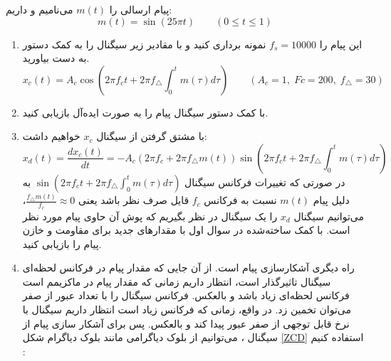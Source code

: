 \documentclass[a4paper]{article}
\begin{document}
پیام ارسالی را $ m(t) $ می‌نامیم و داریم:
\begin{equation*}
	m(t) = \sin(25 \pi t) \qquad (0 \leq t \leq 1)
\end{equation*}
\begin{enumerate}
	\item 
این پیام را 
$ f_{s} = 10000 $
نمونه‌ برداری کنید و با مقادیر زیر سیگنال  را به کمک دستور
  به دست بیاورید.
 \begin{equation*}
	x_{c}(t) = A_{c} \cos(2 \pi f_c t + 2 \pi f_{\triangle} \int_{0}^{t} m(\tau) d\tau) \qquad (A_{c}=1, \; Fc = 200, \; f_{\triangle}=30)
\end{equation*}
	\item 
	با کمک دستور
	  سیگنال پیام را به صورت ایده‌آل بازیابی کنید.
	\item 
	با مشتق گرفتن از سیگنال 
	$ x_{c} $
	خواهیم داشت:
	 \begin{equation*}
	x_{d}(t) = \frac{dx_{c}(t)}{dt} = -A_{c} (2 \pi f_c + 2 \pi f_{\triangle} m(t))\sin(2 \pi f_c t + 2 \pi f_{\triangle} \int_{0}^{t} m(\tau) d\tau) 
	\end{equation*}
در صورتی که تغییرات فرکانس سیگنال 
	$ \sin(2 \pi f_c t + 2 \pi f_{\triangle} \int_{0}^{t} m(\tau) d\tau) $
	به دلیل پیام
	$ m(t) $
	نسبت به فرکانس
	$ f_c $
	قایل صرف نظر باشد یعنی
	$ \frac{f_{\triangle} m(t)}{ f_c} \approx 0 $،
	 می‌توانیم سیگنال 
	$ x_{d} $
را یک سیگنال
در نظر بگیریم که پوش آن حاوی پیام مورد نظر است.
با کمک 
ساخته‌شده در سوال اول با مقدار‌های جدید برای مقاومت و خازن پیام را بازیابی کنید.
	\item 
راه دیگری آشکار‌سازی پیام 
است. از آن‌ جایی که مقدار پیام در فرکانس لحظه‌ای سیگنال تاثیرگذار است، انتظار داریم زمانی که مقدار پیام در ماکزیمم است فرکانس لحظه‌ای زیاد باشد و بالعکس. فرکانس سیگنال را با تعداد عبور از صفر می‌توان تخمین زد. در واقع، زمانی که فرکانس زیاد است انتظار داریم سیگنال با نرخ قابل توجهی از صفر عبور پیدا کند و بالعکس. پس برای آشکار سازی پیام از سیگنال ، می‌توانیم از بلوک دیاگرامی مانند بلوک دیاگرام شکل \ref{ZCD} استفاده ‌کنیم :
\begin{figure}[H]
	\begin{center}
		\begin{tikzpicture}
			[
			block/.style={draw, minimum width=20mm, minimum height=12mm},
			sum/.style={circle, draw, minimum size=6mm, inner sep=0pt,
				node contents={\huge$+$}},
			mult/.style={circle, draw, minimum size=6mm, inner sep=0pt},
			>=Stealth,
			node distance=12mm and 10mm]

\end{tikzpicture}
\end{center}
\end{figure}
\end{enumerate}
\end{document}
